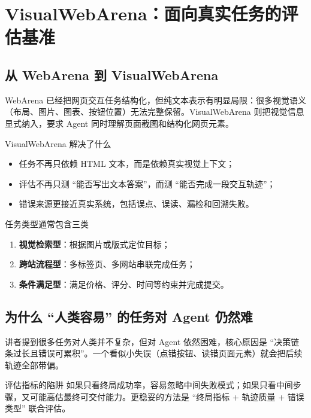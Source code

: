 \section{VisualWebArena：面向真实任务的评估基准}

\subsection{从 WebArena 到 VisualWebArena}
WebArena 已经把网页交互任务结构化，但纯文本表示有明显局限：很多视觉语义（布局、图片、图表、按钮位置）无法完整保留。VisualWebArena 则把视觉信息显式纳入，要求 Agent 同时理解页面截图和结构化网页元素。

\begin{importantbox}{VisualWebArena 解决了什么}
\begin{itemize}
    \item 任务不再只依赖 HTML 文本，而是依赖真实视觉上下文；
    \item 评估不再只测 ``能否写出文本答案''，而测 ``能否完成一段交互轨迹''；
    \item 错误来源更接近真实系统，包括误点、误读、漏检和回溯失败。
\end{itemize}
\end{importantbox}

\begin{knowledgebox}{任务类型通常包含三类}
\begin{enumerate}
    \item \textbf{视觉检索型}：根据图片或版式定位目标；
    \item \textbf{跨站流程型}：多标签页、多网站串联完成任务；
    \item \textbf{条件满足型}：满足价格、评分、时间等约束并完成提交。
\end{enumerate}
\end{knowledgebox}

\subsection{为什么 ``人类容易'' 的任务对 Agent 仍然难}
讲者提到很多任务对人类并不复杂，但对 Agent 依然困难，核心原因是 ``决策链条过长且错误可累积''。一个看似小失误（点错按钮、读错页面元素）就会把后续轨迹全部带偏。

\begin{warningbox}{评估指标的陷阱}
如果只看终局成功率，容易忽略中间失败模式；如果只看中间步骤，又可能高估最终可交付能力。更稳妥的方法是 ``终局指标 + 轨迹质量 + 错误类型'' 联合评估。
\end{warningbox}

